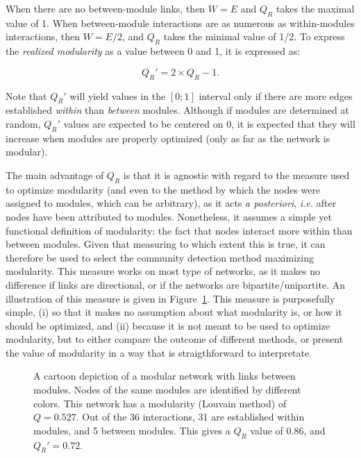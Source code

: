 \documentclass[12pt,oneside]{article}
\begin{document}
When there are no between-module links, then $W = E$ and $Q_R$ takes the
maximal value of 1. When between-module interactions are as numerous as
within-modules interactions, then $W = E/2$, and $Q_R$ takes the minimal value
of 1/2. To express the \emph{realized modularity} as a value between 0 and 1,
it is expressed as:

\begin{equation}
Q_R' = 2\times Q_R - 1 .
\label{e:tqr}
\end{equation}

Note that $Q_R'$ will yield values in the $[0;1]$ interval only if there are
more edges established \emph{within} than \emph{between} modules. Although if
modules are determined at random, $Q_R'$ values are expected to be centered on
0, it is expected that they will increase when modules are properly optimized
(only as far as the network is modular).

The main advantage of $Q_R$ is that it is agnostic with regard to the measure
used to optimize modularity (and even to the method by which the nodes were
assigned to modules, which can be arbitrary), as it acts \emph{a posteriori},
\emph{i.e.} after nodes have been attributed to modules. Nonetheless, it
assumes a simple yet functional definition of modularity: the fact that
nodes interact more within than between modules. Given that measuring to
which extent this is true, it can therefore be used to select the community
detection method maximizing modularity. This measure works on most type
of networks, as it makes no difference if links are directional, or if the
networks are bipartite/unipartite. An illustration of this measure is given
in Figure~\ref{f:illu}. This measure is purposefully simple, (i) so that it
makes no assumption about what modularity is, or how it should be optimized,
and (ii) because it is not meant to be used to optimize modularity, but to
either compare the outcome of different methods, or present the value of
modularity in a way that is straigthforward to interpretate.

\begin{figure}[tb]
\begin{center}

\end{center}
\caption{A cartoon depiction of a modular network with links between modules. Nodes of the same modules are identified by different colors. This network has a modularity (Louvain method) of $Q = 0.527$. Out of the 36 interactions, 31 are established within modules, and 5 between modules. This gives a $Q_R$ value of 0.86, and $Q_R' = 0.72$.}
\label{f:illu}
\end{figure}
\end{document}
